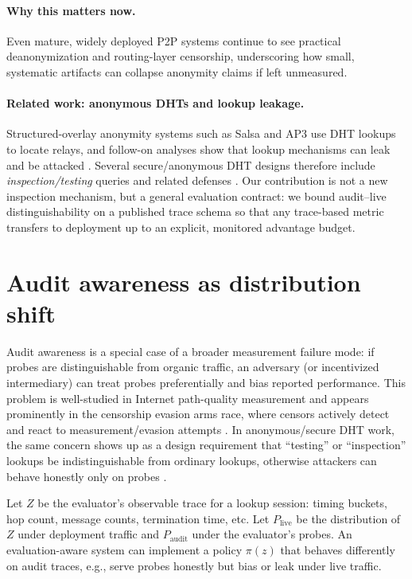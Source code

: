 \documentclass[11pt]{article}
\begin{document}
\paragraph{Why this matters now.}
Even mature, widely deployed P2P systems continue to see practical deanonymization and routing-layer censorship, underscoring how small, systematic artifacts can collapse anonymity claims if left unmeasured.\cite{heimbach2025_eth_validators,sridhar2024ipfs_censorship}
\paragraph{Related work: anonymous DHTs and lookup leakage.}
Structured-overlay anonymity systems such as Salsa \cite{salsa2006} and AP3 \cite{ap32004} use DHT lookups to locate relays, and follow-on analyses show that lookup mechanisms can leak and be attacked \cite{wangmittalborisov2010,mittalborisov2012}.
Several secure/anonymous DHT designs therefore include \emph{inspection/testing} queries and related defenses \cite{octopus2012,ipersea2014}.
Our contribution is not a new inspection mechanism, but a general evaluation contract: we bound audit--live distinguishability on a published trace schema so that any trace-based metric transfers to deployment up to an explicit, monitored advantage budget.

\section{Audit awareness as distribution shift}

Audit awareness is a special case of a broader measurement failure mode: if probes are distinguishable from organic traffic,
an adversary (or incentivized intermediary) can treat probes preferentially and bias reported performance.
This problem is well-studied in Internet path-quality measurement \cite{goldberg2008pqm,tariq2009nano} and appears prominently in the censorship evasion arms race,
where censors actively detect and react to measurement/evasion attempts \cite{deresistor2023}.
In anonymous/secure DHT work, the same concern shows up as a design requirement that ``testing'' or ``inspection'' lookups be indistinguishable from ordinary lookups,
otherwise attackers can behave honestly only on probes \cite{octopus2012,ipersea2014,wangmittalborisov2010}.


Let $Z$ be the evaluator's observable trace for a lookup session: timing buckets, hop count, message counts, termination time, etc.
Let $P_{\mathrm{live}}$ be the distribution of $Z$ under deployment traffic and $P_{\mathrm{audit}}$ under the evaluator's probes.
An evaluation-aware system can implement a policy $\pi(z)$ that behaves differently on audit traces, e.g.,
serve probes honestly but bias or leak under live traffic.
\end{document}
